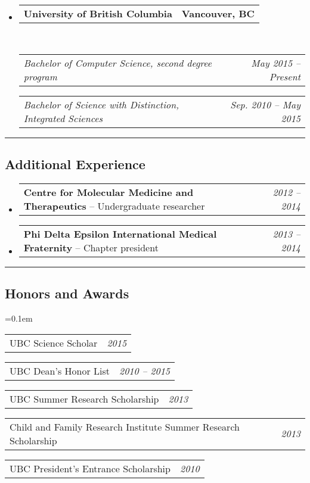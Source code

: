 \documentclass[10pt,letterpaper]{article}
\makeatletter
\newcommand{\headerrow}[2]
{\begin{tabular*}{\linewidth}{l@{\extracolsep{\fill}}r}
	#1 &
	#2 \\
\end{tabular*}}
\makeatother
\begin{document}
\begin{itemize}
	\parskip=0.1em

	\item 
	\headerrow
		{\textbf{University of British Columbia}}
		{\textbf{Vancouver, BC}}
	\\
	\headerrow
		{\emph{Bachelor of Computer Science, second degree program}}
		{\emph{May 2015 -- Present}}
	
	\headerrow
		{\emph{Bachelor of Science with Distinction, Integrated Sciences}}
		{\emph{Sep. 2010 -- May 2015}}
\end{itemize}

\hrule
\vspace{-0.4em}

\subsection*{Additional Experience}

\begin{itemize}
	\parskip=0.1em

	\item 
	\headerrow
		{\textbf{Centre for Molecular Medicine and Therapeutics} -- Undergraduate researcher}
		{\emph{2012 -- 2014}}

	\item 
	\headerrow
		{\textbf{Phi Delta Epsilon International Medical Fraternity} -- Chapter president}
		{\emph{2013 -- 2014}}
\end{itemize}


\hrule
\vspace{-0.4em}

\subsection*{Honors and Awards}

\begin{itemize*}
	\parskip=0.1em
	\item 
	\headerrow
		{{UBC Science Scholar}}
		{\emph{2015}}
	\item 
	\headerrow
		{{UBC Dean's Honor List}}
		{\emph{2010 -- 2015}}
	\item 
	\headerrow
		{{UBC Summer Research Scholarship}}
		{\emph{2013}}
	\item 
	\headerrow
		{{Child and Family Research Institute Summer Research Scholarship}}
		{\emph{2013}}
	\item 
	\headerrow
		{{UBC President's Entrance Scholarship}}
		{\emph{2010}}
\end{itemize*}
\end{document}
